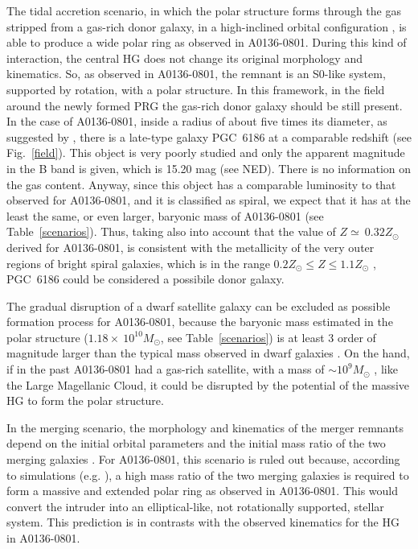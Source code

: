 \documentclass[useAMS,usenatbib]{mn2e}
\begin{document}
The tidal accretion scenario, in which the polar structure forms
through the gas stripped from a gas-rich donor galaxy, in a
high-inclined orbital configuration \citep{Bou03}, is able to produce
a wide polar ring as observed in A0136-0801. During this kind of
interaction, the central HG does not change its original morphology
and kinematics.  So, as observed in A0136-0801, the remnant is an
S0-like system, supported by rotation, with a polar structure.  In
this framework, in the field around the newly formed PRG the gas-rich
donor galaxy should be still present.
%
In the case of A0136-0801, inside a radius of about five times its
diameter, as suggested by \citet{Broc97}, there is a late-type galaxy
PGC~6186 at a comparable redshift (see Fig.~\ref{field}). This object
is very poorly studied and only the apparent magnitude in the B band
is given, which is 15.20 mag (see NED). There is no information on the
gas content. Anyway, since this object has a comparable luminosity to
that observed for A0136-0801, and it is classified as spiral, we expect
that it has at the least the same, or even larger, baryonic mass of
A0136-0801 (see Table~\ref{scenarios}). Thus, taking also into account that the
value of $Z\simeq\ 0.32 Z_{\odot}$ derived for A0136-0801,
is consistent with the metallicity of the very outer regions of bright
spiral galaxies, which is in the range $0.2 Z_{\odot} \leq Z \leq 1.1
Z_{\odot}$ \citep{Bre09}, PGC~6186 could be considered a possibile
donor galaxy.

The gradual disruption of a dwarf satellite galaxy can be excluded as
possible formation process for A0136-0801, because the baryonic mass
estimated in the polar structure ($1.18\times\ 10^{10} M_{\odot}$, see
Table~\ref{scenarios}) is at least 3 order of magnitude larger than
the typical mass observed in dwarf galaxies \citep[$10^{3} M_{\odot}
  \leq M \leq 10^{7} M_{\odot}$][]{Saw11}. On the hand, if in the
past A0136-0801 had a gas-rich satellite, with a mass
of $\sim 10^9 M_{\odot}$ \citep{Kunkel96}, like the Large Magellanic Cloud, it could be
disrupted by the potential of the massive HG to form the polar
structure.

In the merging scenario, the morphology and kinematics of the merger
remnants depend on the initial orbital parameters and the
initial mass ratio of the two merging galaxies \citep{Bou05}. For A0136-0801,
this scenario is ruled out because, according to simulations
(e.g. \citealt{Bou05}), a high mass ratio of the two merging galaxies
is required to form a massive and extended polar ring as observed in
A0136-0801. This would convert the intruder into an elliptical-like,
not rotationally supported, stellar system. This prediction is in
contrasts with the observed kinematics for the HG in A0136-0801.
\end{document}
